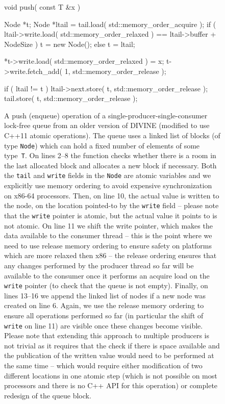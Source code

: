 \begin{figure}[tp]
  \begin{cppcodeln}
    void push( const T &x ) {
        Node *t;
        Node *ltail = tail.load( std::memory_order_acquire );
        if ( ltail->write.load( std::memory_order_relaxed )
                == ltail->buffer + NodeSize )
            t = new Node();
        else
            t = ltail;

        *t->write.load( std::memory_order_relaxed ) = x;
        t->write.fetch_add( 1, std::memory_order_release );

        if ( ltail != t ) {
            ltail->next.store( t, std::memory_order_release );
            tail.store( t, std::memory_order_release );
        }
    }
  \end{cppcodeln}
  \caption{A push (enqueue) operation of a single-producer-single-consumer
    lock-free queue from an older version of DIVINE (modified to use C++11
    atomic operations).
    The queue uses a linked list of blocks (of type \texttt{Node}) which can
    hold a fixed number of elements of some type~\texttt{T}.
    On lines 2--8 the function checks whether there is a room in the last
    allocated block and allocates a new block if necessary.
    Both the \texttt{tail} and \texttt{write} fields in the \texttt{Node} are
    atomic variables and we explicitly use memory ordering to avoid expensive
    synchronization on x86-64 processors.
    Then, on line 10, the actual value is written to the node, on the location
    pointed-to by the \texttt{write} field -- please note that the
    \texttt{write} pointer is atomic, but the actual value it points to is not
    atomic.
    On line 11 we shift the write pointer, which makes the data available to
    the consumer thread -- this is the point where we need to use release
    memory ordering to ensure safety on platforms which are more relaxed then
    x86 -- the release ordering ensures that any changes performed by the
    producer thread so far will be available to the consumer once it performs
    an acquire load on the \texttt{write} pointer (to check that the queue is
    not empty).
    Finally, on lines 13--16 we append the linked list of nodes if a new node
    was created on line 6.
    Again, we use the release memory ordering to ensure all operations
    performed so far (in particular the shift of \texttt{write} on line 11) are
    visible once these changes become visible.
    Please note that extending this approach to multiple producers is not
    trivial as it requires that the check if there is space available and the
    publication of the written value would need to be performed at the same
    time -- which would require either modification of two different locations
    in one atomic step (which is not possible on most processors and there is
    no C++ API for this operation) or complete redesign of the queue block.
  }\label{fig:prelim:lockfree}
\end{figure}

